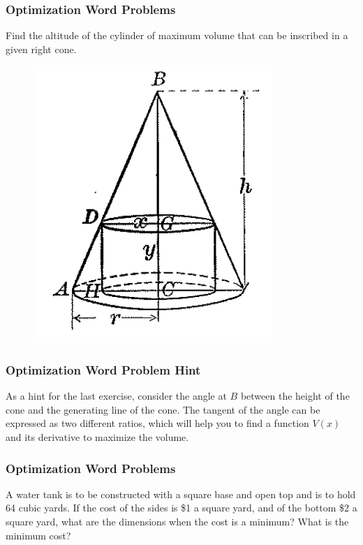 \documentclass[xcolor=dvipsnames]{beamer}
\begin{document}
\begin{frame}
  \frametitle{Optimization Word Problems}
{\ubung} Find the altitude of the cylinder of maximum volume that can
be inscribed in a given right cone.
  \begin{figure}[h]
    \includegraphics[scale=.3]{./diagrams/optcone.png}
  \end{figure}
\end{frame}

\begin{frame}
  \frametitle{Optimization Word Problem Hint}
  As a hint for the last exercise, consider the angle at $B$ between
  the height of the cone and the generating line of the cone. The
  tangent of the angle can be expressed as two different ratios, which
  will help you to find a function $V(x)$ and its derivative to
  maximize the volume.
\end{frame}

\begin{frame}
  \frametitle{Optimization Word Problems}
  {\ubung} A water tank is to be constructed with a square base and
  open top and is to hold 64 cubic yards. If the cost of the sides is
  \$1 a square yard, and of the bottom \$2 a square yard, what are the
  dimensions when the cost is a minimum? What is the minimum cost?
\end{frame}
\end{document}
